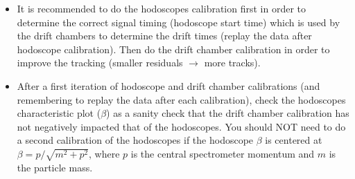 \documentclass[14pt]{article}
\begin{document}
\begin{itemize}
\item It is recommended to do the hodoscopes calibration first in order to determine the correct signal timing (hodoscope start time) which is used
  by the drift chambers to determine the drift times (replay the data after hodoscope calibration). Then do the drift chamber calibration in order to improve the tracking (smaller residuals $\rightarrow$ more tracks). 
\item After a first iteration of hodoscope and drift chamber calibrations (and remembering to replay the data after each calibration), check the hodoscopes characteristic plot ($\beta$) as a sanity check that the drift chamber
calibration has not negatively impacted that of the hodoscopes. You should NOT need to do a second calibration of the hodoscopes if the hodoscope $\beta$ is centered at $\beta = p/\sqrt{m^{2} + p^{2}}$, where $p$ is the
central spectrometer momentum and $m$ is the particle mass.  
\end{itemize}
\end{document}
